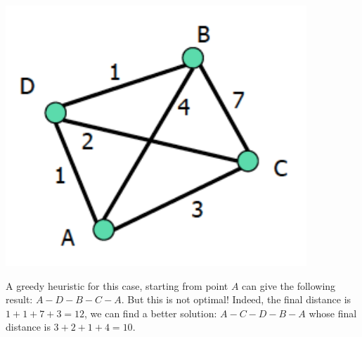 \documentclass[10pt,a4paper]{article}
\begin{document}
\includegraphics[scale=0.2]{tsp.png}

A greedy heuristic for this case, starting from point $A$ can give the following
result: $A-D-B-C-A$. But this is not optimal! Indeed, the final distance is $1+1
+7+3=12$, we can find a better solution: $A-C-D-B-A$ whose final distance is
$3+2+1+4=10$.
\end{document}
